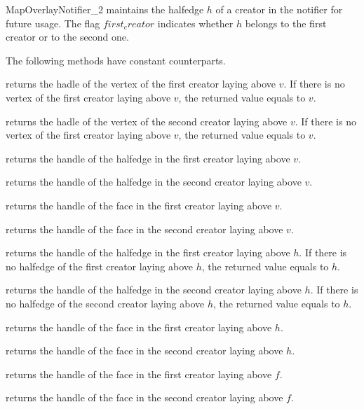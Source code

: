 \begin{ccRefConcept}{MapOverlayNotifier_2}
{maintains the halfedge $h$ of a creator in the notifier 
   for future usage. The flag $first_creator$ indicates 
   whether $h$ belongs to the first creator or to the second one.}


The following methods have constant counterparts.

{returns the hadle of the vertex of the first creator laying above $v$.
   If there is no vertex of the first creator laying above $v$,
   the returned value equals to $v$.}
  
{returns the hadle of the vertex of the second creator laying above $v$.
   If there is no vertex of the first creator laying above $v$,
   the returned value equals to $v$.}

{returns the handle of the halfedge in the first creator laying above $v$.}

{returns the handle of the halfedge in the second creator laying above $v$.}

{returns the handle of the face in the first creator laying above $v$.}

{returns the handle of the face in the second creator laying above $v$.}

{returns the handle of the halfedge in the first creator laying above $h$.
   If there is no halfedge of the first creator laying above $h$,
   the returned value equals to $h$.}

{returns the handle of the halfedge in the second creator laying above $h$.
   If there is no halfedge of the second creator laying above $h$,
   the returned value equals to $h$.}

{returns the handle of the face in the first creator laying above $h$.}

{returns the handle of the face in the second creator laying above $h$.}

{returns the handle of the face in the first creator laying above $f$.}

{returns the handle of the face in the second creator laying above $f$.}

\end{ccRefConcept} %

\ccRefPageEnd
